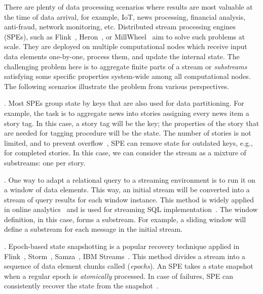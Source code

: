 \label {fs-acker-intro}

There are plenty of data processing scenarios where results are most valuable at the time of data arrival, for example, IoT, news processing, financial analysis, anti-fraud, network monitoring, etc. Distributed stream processing engines (SPEs), such as Flink~\cite{carbone2015apache}, Heron~\cite{Kulkarni:2015:THS:2723372.2742788}, or MillWheel~\cite{Akidau:2013:MFS:2536222.2536229} aim to solve such problems at scale. They are deployed on multiple computational nodes which receive input data elements one-by-one, process them, and update the internal state. The challenging problem here is to aggregate finite parts of a stream or {\em substreams} satisfying some specific properties system-wide among all computational nodes. The following scenarios illustrate the problem from various perspectives.

. Most SPEs group state by keys that are also used for data partitioning. For example, the task is to aggregate news into stories assigning every news item a story tag. In this case, a story tag will be the key; the properties of the story that are needed for tagging procedure will be the state. The number of stories is not limited, and to prevent overflow~\cite{Tucker:2003:EPS:776752.776780}, SPE can remove state for outdated keys, e.g., for completed stories. In this case, we can consider the stream as a mixture of substreams: one per story.  

. One way to adapt a relational query to a streaming environment is to run it on a window of data elements. This way, an initial stream will be converted into a stream of query results for each window instance. This method is widely applied in online analytics~\cite{traub2018scotty} and is used for streaming SQL implementation~\cite{Begoli:2019:OSR:3299869.3314040}. The window definition, in this case, forms a substream. For example, a sliding window will define a substream for each message in the initial stream.

. Epoch-based state snapshotting is a popular recovery technique applied in Flink~\cite{Carbone:2017:SMA:3137765.3137777}, Storm~\cite{Toshniwal:2014:STO:2588555.2595641}, Samza~\cite{Noghabi:2017:SSS:3137765.3137770}, IBM Streams~\cite{jacques2016consistent}. This method divides a stream into a sequence of data element chunks called ({\em epochs}). An SPE takes a state snapshot when a regular epoch is {\em atomically} processed. In case of failures, SPE can consistently recover the state from the snapshot~\cite{2015arXiv150608603C}. 

